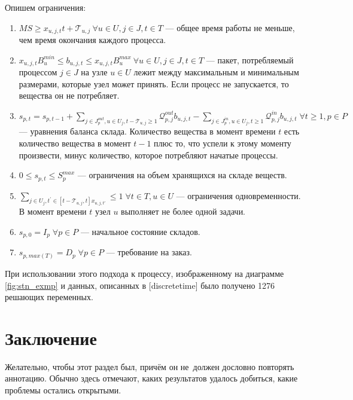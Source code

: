 \documentclass[12pt, twoside]{article}
\theoremstyle{definition}
\newcommand{\Tau}{\mathcal{T}}
\begin{document}
Опишем ограничения:

\begin{enumerate}
	\item $MS \geq x_{u, j, t}t + \Tau_{u, j} \: \forall u \in U, j \in J, t \in T$ --- общее время работы не меньше, чем время окончания каждого процесса.
	\item $x_{u, j, t}B^{min}_u \leq b_{u, j, t} \leq x_{u, j, t}B^{max}_u \: \forall u \in U, j \in J, t \in T$ --- пакет, потребляемый процессом $j \in J$ на узле $u \in U$ лежит между максимальным и минимальным размерами, которые узел может принять. Если процесс не запускается, то вещества он не потребляет.
	\item $s_{p, t} = s_{p, t-1} + \displaystyle\sum_{j \in J^{out}_p, u \in U_j, t - \Tau_{u, j} \geq 1} \mathcal{Q}^{out}_{p, j}b_{u, j, t} - \displaystyle\sum_{j \in J^{in}_p, u \in U_j, t \geq 1} \mathcal{Q}^{in}_{p, j}b_{u, j, t} \; \forall t \geq 1, p \in P$ --- уравнения баланса склада. Количество вещества в момент времени $t$ есть количество вещества в момент $t-1$ плюс то, что успели к этому моменту произвести, минус количество, которое потребляют начатые процессы.
	\item $0 \leq s_{p, t} \leq S^{max}_p$ --- ограничения на объем хранящихся на складе веществ.
	\item $\displaystyle\sum_{j \in U_j, t^{'} \in [t-\Tau_{u, j}, t] x_{u, j, t'}} \leq 1 \; \forall t \in T, u \in U$ --- ограничения одновременности. В момент времени $t$ узел $u$ выполняет не более одной задачи.
	\item $s_{p, 0} = I_p \; \forall p \in P$ --- начальное состояние складов.
	\item $s_{p, max(T)} = D_p \; \forall p \in P$ --- требование на заказ.
\end{enumerate}

При использовании этого подхода к процессу, изображенному на диаграмме \ref{fig:stn_exmp} и данных, описанных в [discretetime] было получено 1276 решающих переменных.
\section{Заключение}
Желательно, чтобы этот раздел был, причём он не~должен дословно повторять аннотацию.
Обычно здесь отмечают, каких результатов удалось добиться, какие проблемы остались открытыми.
\end{document}
